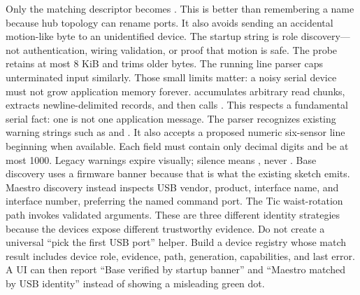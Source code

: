 {}\markdownRendererInterblockSeparator
{}Only the matching descriptor becomes . This is better than remembering a  name because hub topology can rename ports. It also avoids sending an accidental motion-like byte to an unidentified device. The startup string is role discovery—not authentication, wiring validation, or proof that motion is safe.\markdownRendererParagraphSeparator
{}The probe retains at most 8 KiB and trims older bytes. The running line parser caps unterminated input similarly. Those small limits matter: a noisy serial device must not grow application memory forever.\markdownRendererInterblockSeparator
{}\markdownRendererSectionBegin
{}\markdownRendererInterblockSeparator
{} accumulates arbitrary read chunks, extracts newline-delimited records, and then calls . This respects a fundamental serial fact: one  is not one application message.\markdownRendererParagraphSeparator
{}The parser recognizes existing warning strings such as  and . It also accepts a proposed numeric six-sensor line beginning  when available. Each field must contain only decimal digits and be at most 1000. Legacy warnings expire visually; silence means , never .\markdownRendererInterblockSeparator
{}
\markdownRendererSectionEnd 
\markdownRendererSectionEnd \markdownRendererSectionBegin
{}\markdownRendererInterblockSeparator
{}Base discovery uses a firmware banner because that is what the existing sketch emits. Maestro discovery instead inspects USB vendor, product, interface name, and interface number, preferring the named command port. The Tic waist-rotation path invokes validated  arguments. These are three different identity strategies because the devices expose different trustworthy evidence.\markdownRendererParagraphSeparator
{}Do not create a universal “pick the first USB port” helper. Build a device registry whose match result includes device role, evidence, path, generation, capabilities, and last error. A UI can then report “Base verified by startup banner” and “Maestro matched by USB identity” instead of showing a misleading green dot.\markdownRendererInterblockSeparator
